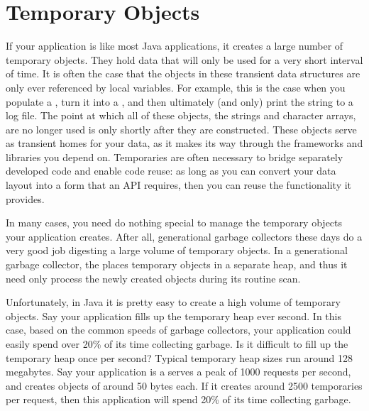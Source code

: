 
\section{Temporary Objects}
\label{temporary-lifetime}

If your application is like most Java applications, it creates a large number of
temporary objects. They hold data that will only be used for a very short
interval of time. It is often the case that the objects in these transient data
structures are only ever referenced by local variables. For example, this is the
case when you populate a , turn it into a , and
then ultimately (and only) print the string to a log file. The point at which all
of these objects, the strings and character arrays, are no longer used is only
shortly after they are constructed. These objects serve as transient homes for
your data, as it makes its way through the frameworks and libraries you depend
on. Temporaries are often necessary to bridge separately developed code and
enable code reuse: as long as you can convert your data layout into a form that
an API requires, then you can reuse the functionality it provides.

In many cases, you need do nothing special to manage the temporary objects your
application creates. After all, generational garbage collectors these days do a
very good job digesting a large volume of temporary objects. In a generational
garbage collector, the \jre places temporary objects in a separate heap, and
thus it need only process the newly created objects during its routine scan.

Unfortunately, in Java it is pretty easy to create a high volume of temporary
objects. Say your application 
fills up the temporary heap ever second. In this case, based on the common
speeds of garbage collectors, your application could easily spend over 20\% of its time
collecting garbage.
Is it difficult to fill up the temporary heap once per second? Typical
temporary heap sizes run around 128 megabytes. Say your application is a serves
a peak of 1000 requests per second, and creates objects of around 50 bytes each.
If it creates around 2500 temporaries per request, then this application will
spend 20\% of its time collecting garbage.


